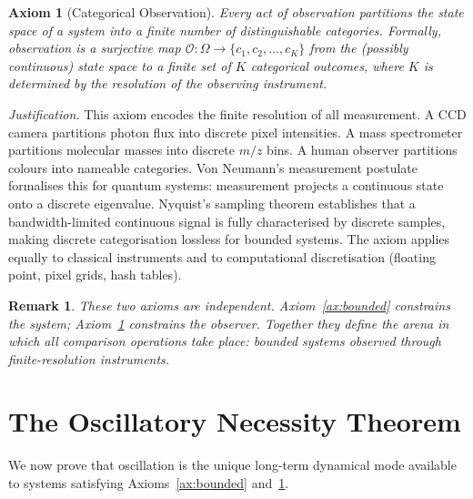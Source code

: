 \documentclass[11pt,twocolumn,a4paper]{article}
\newtheorem{remark}[theorem]{Remark}
\newtheorem{axiom}{Axiom}
\begin{document}
\begin{axiom}[Categorical Observation]
\label{ax:categorical}
Every act of observation partitions the state space of a system into a
finite number of distinguishable categories. Formally, observation is a
surjective map $\mathcal{O}: \Omega \to \{c_1, c_2, \ldots, c_K\}$
from the (possibly continuous) state space to a finite set of $K$
categorical outcomes, where $K$ is determined by the resolution of the
observing instrument.
\end{axiom}

\noindent\emph{Justification.} This axiom encodes the finite resolution
of all measurement. A CCD camera partitions photon flux into discrete
pixel intensities. A mass spectrometer partitions molecular masses into
discrete $m/z$ bins. A human observer partitions colours into nameable
categories. Von Neumann's measurement postulate \citep{vonneumann1932}
formalises this for quantum systems: measurement projects a continuous
state onto a discrete eigenvalue. Nyquist's sampling theorem
\citep{nyquist1928} establishes that a bandwidth-limited continuous
signal is fully characterised by discrete samples, making discrete
categorisation lossless for bounded systems. The axiom applies equally
to classical instruments and to computational discretisation (floating
point, pixel grids, hash tables).

\begin{remark}
These two axioms are independent. Axiom~\ref{ax:bounded} constrains the
system; Axiom~\ref{ax:categorical} constrains the observer. Together
they define the arena in which all comparison operations take place:
bounded systems observed through finite-resolution instruments.
\end{remark}


\section{The Oscillatory Necessity Theorem}
\label{sec:oscillatory_necessity}

We now prove that oscillation is the unique long-term dynamical mode
available to systems satisfying Axioms~\ref{ax:bounded}
and~\ref{ax:categorical}.
\end{document}
